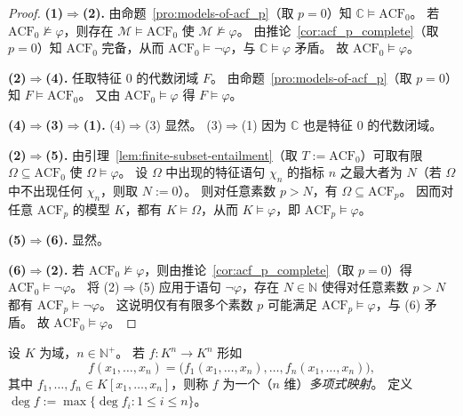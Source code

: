 \documentclass[lang=cn,a4paper,newtx,section]{elegantbook}
\begin{document}
 \begin{proof}
 \textbf{(1)$\Rightarrow$(2).}
 由命题~\ref{pro:models-of-acf_p}（取 $p=0$）知 $\mathbb C\models\mathrm{ACF}_0$。
 若 $\mathrm{ACF}_0\not\models\varphi$，则存在 $\mathcal M\models\mathrm{ACF}_0$ 使 $\mathcal M\not\models\varphi$。
 由推论~\ref{cor:acf_p_complete}（取 $p=0$）知 $\mathrm{ACF}_0$ 完备，从而 $\mathrm{ACF}_0\models\neg\varphi$，与 $\mathbb C\models\varphi$ 矛盾。
 故 $\mathrm{ACF}_0\models\varphi$。
 
 \textbf{(2)$\Rightarrow$(4).}
 任取特征 $0$ 的代数闭域 $F$。
 由命题~\ref{pro:models-of-acf_p}（取 $p=0$）知 $F\models\mathrm{ACF}_0$。
 又由 $\mathrm{ACF}_0\models\varphi$ 得 $F\models\varphi$。
 
 \textbf{(4)$\Rightarrow$(3)$\Rightarrow$(1).}
 (4)$\Rightarrow$(3) 显然。
 (3)$\Rightarrow$(1) 因为 $\mathbb C$ 也是特征 $0$ 的代数闭域。
 
 \textbf{(2)$\Rightarrow$(5).}
 由引理~\ref{lem:finite-subset-entailment}（取 $T:=\mathrm{ACF}_0$）可取有限 $\Omega\subseteq\mathrm{ACF}_0$ 使 $\Omega\models\varphi$。
 设 $\Omega$ 中出现的特征语句 $\chi_n$ 的指标 $n$ 之最大者为 $N$（若 $\Omega$ 中不出现任何 $\chi_n$，则取 $N:=0$）。
 则对任意素数 $p>N$，有 $\Omega\subseteq\mathrm{ACF}_p$。
 因而对任意 $\mathrm{ACF}_p$ 的模型 $K$，都有 $K\models\Omega$，从而 $K\models\varphi$，即 $\mathrm{ACF}_p\models\varphi$。
 
 \textbf{(5)$\Rightarrow$(6).}
 显然。
 
 \textbf{(6)$\Rightarrow$(2).}
 若 $\mathrm{ACF}_0\not\models\varphi$，则由推论~\ref{cor:acf_p_complete}（取 $p=0$）得 $\mathrm{ACF}_0\models\neg\varphi$。
 将 (2)$\Rightarrow$(5) 应用于语句 $\neg\varphi$，存在 $N\in\mathbb N$ 使得对任意素数 $p>N$ 都有 $\mathrm{ACF}_p\models\neg\varphi$。
 这说明仅有有限多个素数 $p$ 可能满足 $\mathrm{ACF}_p\models\varphi$，与 (6) 矛盾。
 故 $\mathrm{ACF}_0\models\varphi$。
 \end{proof}
 
 \begin{definition}[多项式映射]
 \label{polynomial-map}
 设 $K$ 为域，$n\in\mathbb N^{+}$。
 若 $f:K^n\to K^n$ 形如
 \[
   f(x_1,\dots,x_n)=\bigl(f_1(x_1,\dots,x_n),\dots,f_n(x_1,\dots,x_n)\bigr),
 \]
 其中 $f_1,\dots,f_n\in K[x_1,\dots,x_n]$，则称 $f$ 为一个（$n$ 维）\emph{多项式映射}。
 定义 $\deg f:=\max\{\deg f_i:1\le i\le n\}$。
 \end{definition}
 
\end{document}
